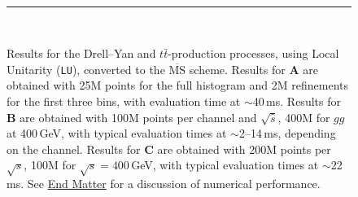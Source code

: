 \documentclass[%
 reprint,
 amsmath,amssymb,
 superscriptaddress,
 aps,
 preprintnumbers,
prl,
floatfix,
]{revtex4-2}
\let\label\latexKernelLabel
\begin{document}
\begin{figure}[!tp]
\begin{minipage}{\columnwidth}

\end{minipage}
\phantom{g}\\[0.1cm]
\begin{minipage}{0.45\textwidth}
\begin{minipage}{1\textwidth}

\end{minipage}
\end{minipage}
\begin{minipage}{0.45\textwidth}
\begin{minipage}{1\textwidth}

\end{minipage}
\end{minipage}
\begin{minipage}{0.45\textwidth}
\begin{minipage}{1\textwidth}

\end{minipage}
\end{minipage}

\caption{\justifying Results for the Drell--Yan and $t\bar{t}$-production processes, using Local Unitarity (\texttt{LU}), converted to the $\overline{\text{MS}}$ scheme. Results for \textbf{A} are obtained with 25M points for the full histogram and 2M refinements for the first three bins, with evaluation time at $\sim$40\,ms. Results for \textbf{B} are obtained with 100M points per channel and $\sqrt{\hat{s}}$, 400M for $gg$ at 400\,GeV, with typical evaluation times at $\sim$2--14\,ms, depending on the channel. Results for \textbf{C} are obtained with 200M points per $\sqrt{s}$, 100M for $\sqrt{s}=400$\,GeV, with typical evaluation times at $\sim$22\,ms. See \hyperref[sec:numerical_performance]{End Matter} for a discussion of numerical performance.}
{\color{gray!50}\rule{0.8\linewidth}{0.6pt}}
\label{fig:results}
\phantom{g}\\[-0.5cm]
\end{figure}
\end{document}
